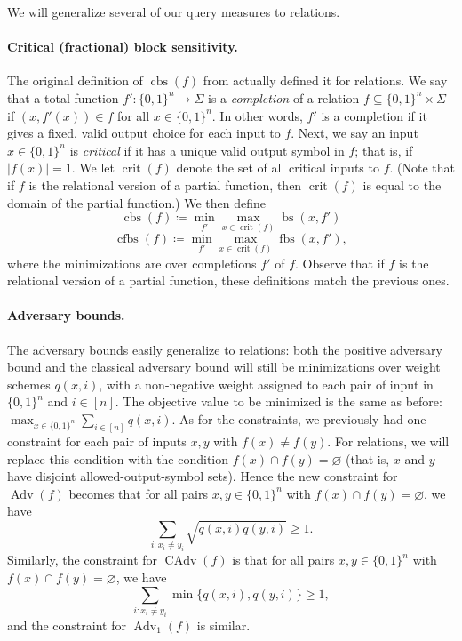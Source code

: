 \documentclass[10pt,a4paper]{article}
\theoremstyle{definition}
\newcommand{\B}{\{0,1\}}
\renewcommand{\>}{\rangle}
\newcommand{\<}{\langle}
\DeclareMathOperator{\bs}{bs}
\DeclareMathOperator{\fbs}{fbs}
\DeclareMathOperator{\cbs}{cbs}
\DeclareMathOperator{\cfbs}{cfbs}
\DeclareMathOperator{\Adv}{Adv}
\DeclareMathOperator{\CAdv}{CAdv}
\DeclareMathOperator{\crit}{crit}
\begin{document}
We will generalize several of our query measures to relations.

\paragraph{Critical (fractional) block sensitivity.}
The original definition of $\cbs(f)$ from \cite{HN12} actually
defined it for relations.
We say that a total function $f'\colon\B^n\to\Sigma$
is a \emph{completion} of a relation $f\subseteq \B^n\times\Sigma$
if $(x,f'(x))\in f$ for all $x\in\B^n$. In other words,
$f'$ is a completion if it gives a fixed, valid
output choice for each input to $f$. Next, we say an input
$x\in\B^n$ is \emph{critical} if it has a unique valid
output symbol in $f$; that is, if $|f(x)|=1$.
We let $\crit(f)$ denote the set of all critical inputs
to $f$.
(Note that if $f$ is the relational version of a partial function,
then $\crit(f)$ is equal to the domain of the partial function.)
We then define
\[\cbs(f)\coloneqq \min_{f'}\max_{x\in\crit(f)}\bs(x,f')\]
\[\cfbs(f)\coloneqq \min_{f'}\max_{x\in\crit(f)}\fbs(x,f'),\]
where the minimizations are over completions $f'$ of $f$.
Observe that if $f$ is the relational version
of a partial function, these definitions
match the previous ones.

\paragraph{Adversary bounds.}
The adversary bounds easily generalize to relations:
both the positive adversary bound and the classical adversary
bound will still be minimizations over weight schemes
$q(x,i)$, with a non-negative weight assigned to each pair of
input in $\B^n$ and $i\in[n]$. The objective value to be
minimized is the same as before:
$\max_{x\in\B^n}\sum_{i\in[n]} q(x,i)$.
As for the constraints, we previously had one constraint
for each pair of inputs $x,y$ with $f(x)\ne f(y)$.
For relations, we will replace this condition with the condition
$f(x)\cap f(y)=\varnothing$ (that is, $x$ and $y$ have
disjoint allowed-output-symbol sets). Hence the new constraint
for $\Adv(f)$ becomes that for all pairs $x,y\in\B^n$
with $f(x)\cap f(y)=\varnothing$, we have
\[\sum_{i:x_i\ne y_i}\sqrt{q(x,i)q(y,i)}\ge 1.\]
Similarly, the constraint for $\CAdv(f)$ is that for all pairs
$x,y\in\B^n$ with $f(x)\cap f(y)=\varnothing$, we have
\[\sum_{i:x_i\ne y_i}\min\{q(x,i),q(y,i)\}\ge 1,\]
and the constraint for $\Adv_1(f)$ is similar.
\end{document}
